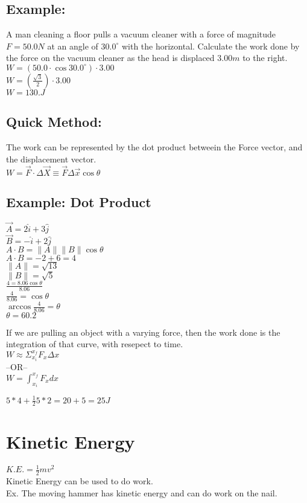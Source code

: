 \documentclass[]{article}
\begin{document}
\subsection*{Example:}
A man cleaning a floor pulls a vacuum cleaner with a force of magnitude $F = 50.0N$ at an angle of $30.0^{\circ}$ with the horizontal. Calculate the work done by the force on the vacuum cleaner as the head is displaced $3.00m$ to the right.\\
$W = (50.0 \cdot \cos 30.0^{\circ}) \cdot 3.00$\\
$W = (\frac{\sqrt{3}}{2}) \cdot 3.00$\\
$W = 130.J$

\subsection*{Quick Method:}
The work can be represented by the dot product betweein the Force vector, and the displacement vector.\\
$W = \vec{F} \cdot \Delta \vec{X} \equiv \vec{F} \Delta \vec{x} \cos\theta$\\

\subsection*{Example: Dot Product}
$\vec{A} = 2\hat{i} + 3\hat{j}$\\
$\vec{B} = -\hat{i} + 2\hat{j}$\\
$A\cdot B = \|A\|\|B\|\cos\theta$\\
$A\cdot B = -2 + 6 = 4$\\
$\|A\| = \sqrt{13}$\\
$\|B\| = \sqrt{5}$\\
$\frac{4 = 8.06 \cos\theta}{8.06}$\\
$\frac{4}{8.06} = \cos\theta$\\
$\arccos\frac{4}{8.06} = \theta$\\
$\theta = 60.2$


If we are pulling an object with a varying force, then the work done is the integration of that curve, with resepect to time.
\large\\$W \approx \Sigma_{x_i}^{x_f} F_x\Delta x$\\
--OR--\\
$W = \int_{x_i}^{x_f}F_xdx$

$5 * 4 + \frac{1}{2}5 * 2 = 20 + 5 = 25J$

\section*{Kinetic Energy}
$K.E. = \frac{1}{2}mv^2$\\
Kinetic Energy can be used to do work.\\
Ex. The moving hammer has kinetic energy and can do work on the nail.
\end{document}
